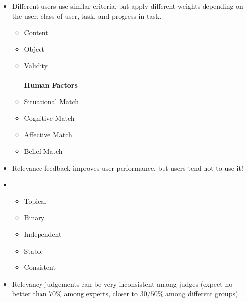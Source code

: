 \documentclass{article}
\begin{document}
\begin{itemize}
    
\item {}
    Different users use similar criteria, but apply different weights depending on the user, class of user, task, and progress in task.
    \begin{itemize}
    {\bf Criteria:}\\
    {\bf Information Factors}
    \item Content \\
    \item Object \\
    \item Validity \\
         \\
    {\bf Human Factors}
    \item Situational Match \\
    \item Cognitive Match \\
    \item Affective Match \\
    \item Belief Match
    \end{itemize}

\item Relevance feedback improves user performance, but users tend not to use it!

\item {}
    \begin{itemize}
    \item Topical
    \item Binary
    \item Independent
    \item Stable
    \item Consistent
    \end{itemize}

\item {}  Relevancy judgements can be very inconsistent among judges (expect no better than $70$\% among experts, closer to $30/50$\% among different groups).


\end{itemize}
\end{document}
